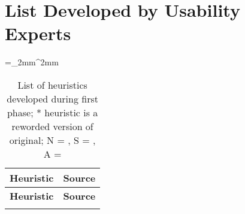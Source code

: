 \section{List Developed by Usability Experts}
\label{appsec:experts_list}
\begin{singlespace}
		\tabulinesep=_2mm^2mm
	\begin{longtabu} to \textwidth {X[1, p] c}
			\caption[List of heuristics developed during first phase]{List of heuristics developed during first phase; * heuristic is a reworded version of original; N = \citet{Nielsen1994a}, S = \citet{Singh2009}, A = \citet{Ardito2006}}\\
			\toprule
			\textbf{Heuristic} & \textbf{Source} \\
			\midrule
		\endfirsthead
			
			\textbf{Heuristic} & \textbf{Source} \\
			\midrule
		\endhead
		
			\bottomrule
		\endlastfoot
		

\end{longtabu}
\end{singlespace}
